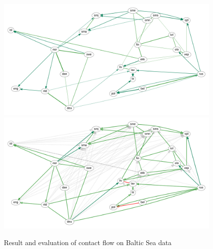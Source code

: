  \begin{figure}
 \includegraphics[width=\textwidth]{figures/baltic-contact-fs-tss.pdf}
 \vspace*{5mm}
 \includegraphics[width=\textwidth]{figures/baltic-contact-fs-tss-eval.pdf}
 \caption{Result and evaluation of contact flow on Baltic Sea data}
 \label{baltic-result-contact}
 \end{figure}
 
